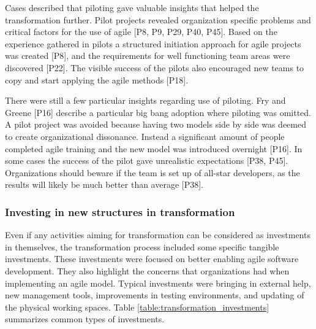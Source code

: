 Cases described that piloting gave valuable insights that helped the
transformation further.
Pilot projects revealed organization specific problems and critical factors for
the use of agile [P8, P9, P29, P40, P45].
Based on the experience gathered in pilots a structured initiation approach for
agile projects was created [P8], and the requirements for well functioning team
areas were discovered [P22].
The visible success of the pilots also encouraged new teams to copy and start
applying the agile methods [P18].


There were still a few particular insights regarding use of piloting.
Fry and Greene [P16] describe a particular big bang adoption where piloting was
omitted. A pilot project was avoided because having two models side by side was
deemed to create organizational dissonance. Instead a significant amount of
people completed agile training and the new model was introduced overnight
[P16].
In some cases the success of the pilot gave unrealistic expectations [P38, P45].
Organizations should beware if the team is set up of all-star developers, as
the results will likely be much better than average [P38].



\subsubsection{Investing in new structures in transformation}

Even if any activities aiming for transformation can be considered as
investments in themselves, the transformation process included some specific
tangible investments. These investments were focused on better enabling agile
software development. They also highlight the concerns that organizations had when
implementing an agile model. Typical investments were bringing in external help,
new management tools, improvements in testing environments, and updating of the
physical working spaces. Table \ref{table:transformation_investments} summarizes
common types of investments.


